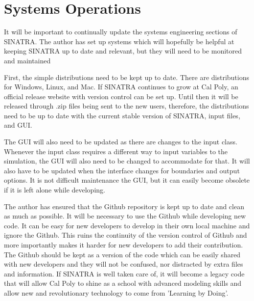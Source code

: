 \section{Systems Operations}

It will be important to continually update the systems engineering sections of SINATRA. The author has set up systems which will hopefully be helpful at keeping SINATRA up to date and relevant, but they will need to be monitored and maintained
 \par

\indent First, the simple distributions need to be kept up to date. There are distributions for Windows, Linux, and Mac. If SINATRA continues to grow at Cal Poly, an official release website with version control can be set up. Until then it will be released through .zip files being sent to the new users, therefore, the distributions need to be up to date with the current stable version of SINATRA, input files, and GUI. \par

\indent The GUI will also need to be updated as there are changes to the input class. Whenever the input class requires a different way to input variables to the simulation, the GUI will also need to be changed to accommodate for that. It will also have to be updated when the interface changes for boundaries and output options. It is not difficult maintenance the GUI, but it can easily become obsolete if it is left alone while developing. \par

\indent The author has ensured that the Github repository is kept up to date and clean as much as possible. It will be necessary to use the Github while developing new code. It can be easy for new developers to develop in their own local machine and ignore the Github. This ruins the continuity of the version control of Github and more importantly makes it harder for new developers to add their contribution. The Github should be kept as a version of the code which can be easily shared with new developers and they will not be confused, nor distracted by extra files and information. If SINATRA is well taken care of, it will become a legacy code that will allow Cal Poly to shine as a school with advanced modeling skills and allow new and revolutionary technology to come from ’Learning by Doing’.




